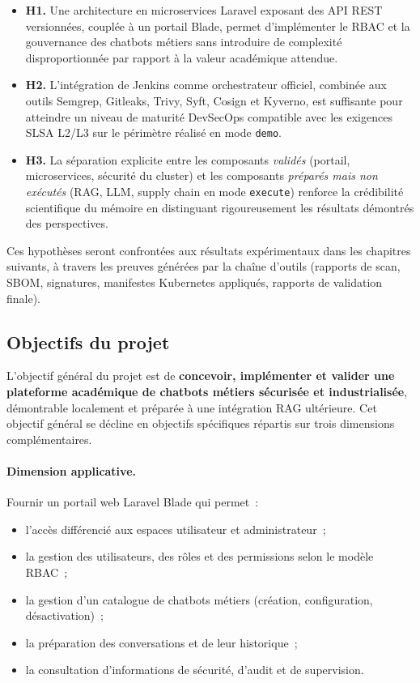 \begin{itemize}
    \item \textbf{H1.} Une architecture en microservices Laravel exposant des API REST versionnées, couplée à un portail Blade, permet d'implémenter le RBAC et la gouvernance des chatbots métiers sans introduire de complexité disproportionnée par rapport à la valeur académique attendue.
    \item \textbf{H2.} L'intégration de Jenkins comme orchestrateur officiel, combinée aux outils Semgrep, Gitleaks, Trivy, Syft, Cosign et Kyverno, est suffisante pour atteindre un niveau de maturité DevSecOps compatible avec les exigences SLSA L2/L3 \cite{slsa_spec_v1} sur le périmètre réalisé en mode \texttt{demo}.
    \item \textbf{H3.} La séparation explicite entre les composants \textit{validés} (portail, microservices, sécurité du cluster) et les composants \textit{préparés mais non exécutés} (RAG, LLM, supply chain en mode \texttt{execute}) renforce la crédibilité scientifique du mémoire en distinguant rigoureusement les résultats démontrés des perspectives.
\end{itemize}

Ces hypothèses seront confrontées aux résultats expérimentaux dans les chapitres suivants, à travers les preuves générées par la chaîne d'outils (rapports de scan, SBOM, signatures, manifestes Kubernetes appliqués, rapports de validation finale).

\subsection{Objectifs du projet}

L'objectif général du projet est de \textbf{concevoir, implémenter et valider une plateforme académique de chatbots métiers sécurisée et industrialisée}, démontrable localement et préparée à une intégration RAG ultérieure. Cet objectif général se décline en objectifs spécifiques répartis sur trois dimensions complémentaires.

\paragraph{Dimension applicative.} Fournir un portail web Laravel Blade qui permet~:
\begin{itemize}
    \item l'accès différencié aux espaces utilisateur et administrateur~;
    \item la gestion des utilisateurs, des rôles et des permissions selon le modèle RBAC~;
    \item la gestion d'un catalogue de chatbots métiers (création, configuration, désactivation)~;
    \item la préparation des conversations et de leur historique~;
    \item la consultation d'informations de sécurité, d'audit et de supervision.
\end{itemize}

